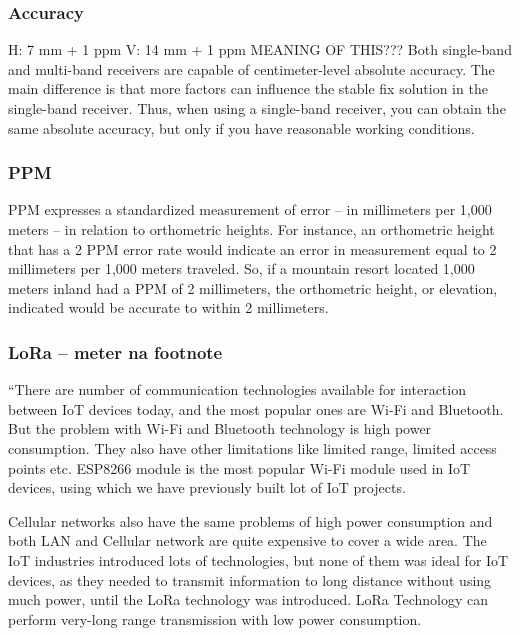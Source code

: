 \subsubsection{Accuracy}\label{sec:II_gnssAug_rtk_accuracy}
H: 7 mm + 1 ppm
V: 14 mm + 1 ppm	MEANING OF THIS???
Both single-band and multi-band receivers are capable of centimeter-level absolute accuracy. The main difference is that more factors can influence the stable fix solution in the single-band receiver. Thus, when using a single-band receiver, you can obtain the same absolute accuracy, but only if you have reasonable working conditions.

\subsubsection{PPM}\label{sec:II_gnssAug_rtk_ppm}
PPM expresses a standardized measurement of error -- in millimeters per 1,000 meters -- in relation to orthometric heights. For instance, an orthometric height that has a 2 PPM error rate would indicate an error in measurement equal to 2 millimeters per 1,000 meters traveled. So, if a mountain resort located 1,000 meters inland had a PPM of 2 millimeters, the orthometric height, or elevation, indicated would be accurate to within 2 millimeters.

\subsubsection{LoRa -- meter na footnote}\label{sec:II_gnssAug_rtk_LoRa}
``There are number of communication technologies available for interaction between IoT devices today, and the most popular ones are Wi-Fi and Bluetooth. But the problem with Wi-Fi and Bluetooth technology is high power consumption. They also have other limitations like limited range, limited access points etc. ESP8266 module is the most popular Wi-Fi module used in IoT devices, using which we have previously built lot of IoT projects.

Cellular networks also have the same problems of high power consumption and both LAN and Cellular network are quite expensive to cover a wide area. The IoT industries introduced lots of technologies, but none of them was ideal for IoT devices, as they needed to transmit information to long distance without using much power, until the LoRa technology was introduced. LoRa Technology can perform very-long range transmission with low power consumption.

